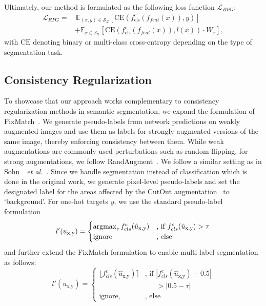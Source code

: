 \documentclass[letterpaper]{article} %
\def\argmax{\mathop{\rm argmax}}
\newcommand{\etal}{~\emph{et al.}}
\begin{document}
Ultimately, our method is formulated as the following loss function $\mathcal{L}_{RPG}$:
\begin{align}
    \mathcal{L}_{RPG} = &
    \, \mathbb{E}_{(x,y)\in \mathcal{S}_\mathcal{L}}
    [\mathrm{CE}(f_{\text{cls}}^c(f_{feat}(x)),y) ]
    \nonumber\\ \quad
    & +
    \mathbb{E}_{x\in \mathcal{S}_\mathcal{U}}
    [\mathrm{CE}(f_{\text{cls}}^c(f_{feat}(x)),l(x)) \cdot W_{x}],
\end{align}
with $\mathrm{CE}$ denoting binary or multi-class cross-entropy depending on the type of segmentation task.

\subsection{Consistency Regularization}
To showcase that our approach works complementary to consistency regularization methods in semantic segmentation, we expand the formulation of FixMatch~\cite{sohn2020fixmatch}.
We generate pseudo-labels from network predictions on weakly augmented images and use them as labels for strongly augmented versions of the same image, thereby enforcing consistency between them. %
While weak augmentations are commonly used perturbations such as random flipping, for strong augmentations, we follow RandAugment~\cite{cubuk2020randaugment}.
We follow a similar setting as in Sohn~\etal~\cite{sohn2020fixmatch}.
Since we handle segmentation instead of classification which is done in the original work, we generate pixel-level pseudo-labels and set the designated label for the areas affected by the CutOut augmentation~\cite{devries2017improved} to `background'.
For one-hot targets $y$, we use the standard pseudo-label formulation~\cite{sohn2020fixmatch}
\begin{equation}\label{eq:multi-class}
    l'( u_{\text{x},\text{y}}) =
    \begin{cases}
        \argmax_{c} f_{cls}^c(\hat u_{\text{x},\text{y}})       &         \text{, if } f_{cls}^c(\hat  u_{\text{x,y}})>\tau
    \\
    \text{ignore} & \text{, else}
    \end{cases}
\end{equation}
and further extend the FixMatch formulation to enable multi-label segmentation as follows:
\begin{equation}\label{eq:multi-label}
    l'( u_{\text{x},\text{y}}) =
    \begin{cases}
        \lfloor f_{cls}^c(\hat u_{\text{x},\text{y}}) \rceil
         & \text{, if } |f_{cls}^c(\hat  u_{\text{x},\text{y}}) - 0.5 | \\ & \quad \;\; > |0.5 - \tau|
    \\
    \text{ignore} ,& \text{, else}
    \end{cases}
\end{equation}
\end{document}
